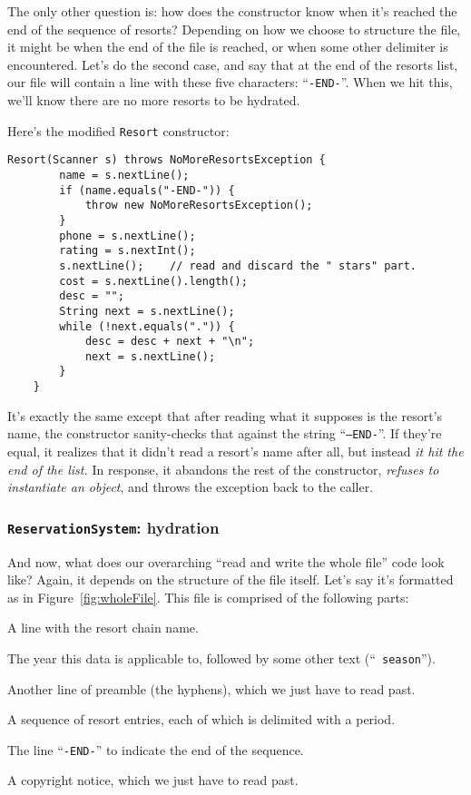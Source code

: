 The only other question is: how does the constructor know when it's reached
the end of the sequence of resorts? Depending on how we choose to structure
the file, it might be when the end of the file is reached, or when some other
delimiter is encountered. Let's do the second case, and say that at the end of
the resorts list, our file will contain a line with these five characters:
``\texttt{-END-}''. When we hit this, we'll know there are no more resorts to be
hydrated.

Here's the modified \texttt{Resort} constructor:

\begin{Verbatim}[fontsize=\footnotesize,samepage=true,frame=single]
    Resort(Scanner s) throws NoMoreResortsException {
        name = s.nextLine();
        if (name.equals("-END-")) {
            throw new NoMoreResortsException();
        }
        phone = s.nextLine();
        rating = s.nextInt();
        s.nextLine();    // read and discard the " stars" part.
        cost = s.nextLine().length();
        desc = "";
        String next = s.nextLine();
        while (!next.equals(".")) {
            desc = desc + next + "\n";
            next = s.nextLine();
        }
    }
\end{Verbatim}

It's exactly the same except that after reading what it supposes is the
resort's name, the constructor sanity-checks that against the string
``\texttt{--END-}''. If they're equal, it realizes that it didn't read a
resort's name after all, but instead \textit{it hit the end of the list.} In
response, it abandons the rest of the constructor, \textit{refuses to
instantiate an object}, and throws the exception back to the caller.

\subsubsection{\texttt{ReservationSystem}: hydration}

And now, what does our overarching ``read and write the whole file'' code look
like? Again, it depends on the structure of the file itself. Let's say it's
formatted as in Figure~\ref{fig:wholeFile}. This file is comprised of the
following parts:

\begin{compactenum}
\item A line with the resort chain name.
\item The year this data is applicable to, followed by some other text
(``\texttt{ season}'').
\item Another line of preamble (the hyphens), which we just have to read
past.
\item A sequence of resort entries, each of which is delimited with a period.
\item The line ``\texttt{-END-}'' to indicate the end of the sequence.
\item A copyright notice, which we just have to read past.
\end{compactenum}


